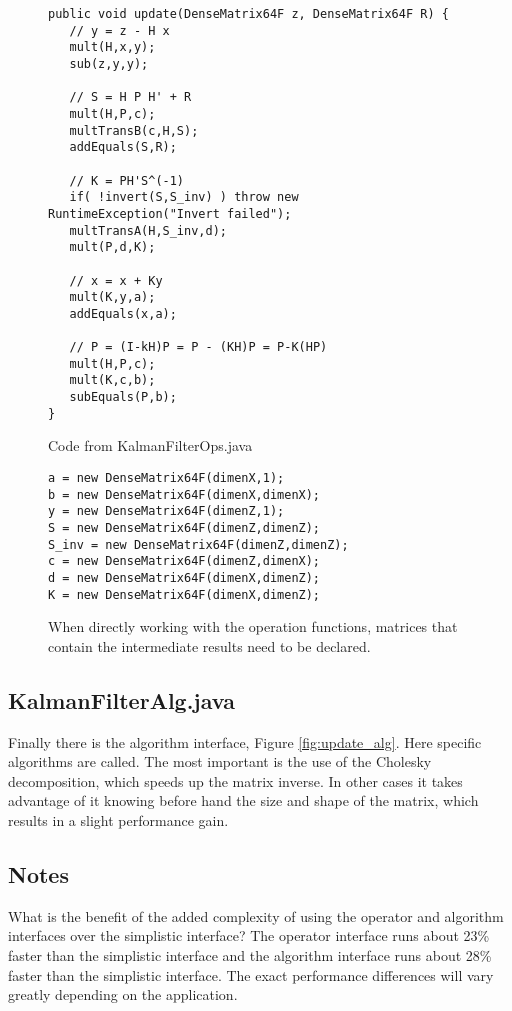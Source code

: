 \documentclass[12pt]{article}%
\begin{document}
\begin{figure}[h]
\begin{verbatim}
public void update(DenseMatrix64F z, DenseMatrix64F R) {
   // y = z - H x
   mult(H,x,y);
   sub(z,y,y);

   // S = H P H' + R
   mult(H,P,c);
   multTransB(c,H,S);
   addEquals(S,R);

   // K = PH'S^(-1)
   if( !invert(S,S_inv) ) throw new RuntimeException("Invert failed");
   multTransA(H,S_inv,d);
   mult(P,d,K);

   // x = x + Ky
   mult(K,y,a);
   addEquals(x,a);

   // P = (I-kH)P = P - (KH)P = P-K(HP)
   mult(H,P,c);
   mult(K,c,b);
   subEquals(P,b);
}
\end{verbatim} 
\caption{\label{fig:update_ops}Code from KalmanFilterOps.java}
\end{figure}

\begin{figure}
\begin{verbatim}
a = new DenseMatrix64F(dimenX,1);
b = new DenseMatrix64F(dimenX,dimenX);
y = new DenseMatrix64F(dimenZ,1);
S = new DenseMatrix64F(dimenZ,dimenZ);
S_inv = new DenseMatrix64F(dimenZ,dimenZ);
c = new DenseMatrix64F(dimenZ,dimenX);
d = new DenseMatrix64F(dimenX,dimenZ);
K = new DenseMatrix64F(dimenX,dimenZ);
\end{verbatim}
\caption{\label{fig:predeclare}When directly working with the operation functions, matrices that contain the intermediate results need to be declared.}
\end{figure}

\subsection{KalmanFilterAlg.java}
Finally there is the algorithm interface, Figure \ref{fig:update_alg}.  Here specific algorithms are called.  The most important is the use of the Cholesky decomposition, which speeds up the matrix inverse.  In other cases it takes advantage of it knowing before hand the size and shape of the matrix, which results in a slight performance gain.

\subsection{Notes}
What is the benefit of the added complexity of using the operator and algorithm interfaces over the simplistic interface?  The operator interface runs about 23\% faster than the simplistic interface and the algorithm interface runs about 28\% faster than the simplistic interface.  The exact performance differences will vary greatly depending on the application.
\end{document}
